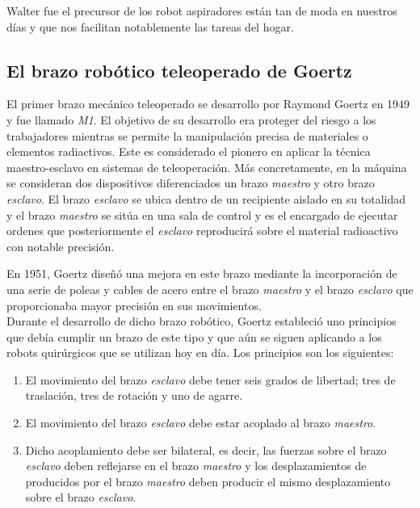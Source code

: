 Walter fue el precursor de los robot aspiradores están tan de moda en nuestros días y que nos facilitan notablemente las tareas del hogar.


\subsection{El brazo robótico teleoperado de Goertz}


El primer brazo mecánico teleoperado se desarrollo por Raymond Goertz en 1949 y fue llamado \textit{M1}. El objetivo de su desarrollo era proteger del riesgo a los trabajadores mientras se permite la manipulación precisa de materiales o elementos radiactivos. Este es considerado el pionero en aplicar la técnica maestro-esclavo en sistemas de teleoperación. Más concretamente, en la máquina se consideran dos dispositivos diferenciados un brazo \textit{maestro} y otro brazo \textit{esclavo}. El brazo \textit{esclavo} se ubica dentro de un recipiente aislado en su totalidad y el brazo \textit{maestro} se sitúa en una sala de control y es el encargado de ejecutar ordenes que posteriormente el \textit{esclavo} reproducirá sobre el material radioactivo con notable precisión.

En 1951, Goertz diseñó una mejora en este brazo mediante la incorporación de una serie de poleas y cables de acero entre el brazo \textit{maestro} y el brazo \textit{esclavo} que proporcionaba mayor precisión en sus movimientos.\\

Durante el desarrollo de dicho brazo robótico, Goertz estableció uno principios que debía cumplir un brazo de este tipo y que aún se siguen aplicando a los robots quirúrgicos que se utilizan hoy en día. Los principios son los siguientes:

\begin{enumerate}
\item El movimiento del brazo \textit{esclavo} debe tener seis grados de libertad; tres de traslación, tres de rotación y uno de agarre.

\item El movimiento del brazo \textit{esclavo} debe estar acoplado al brazo \textit{maestro}.

\item Dicho acoplamiento debe ser bilateral, es decir, las fuerzas sobre el brazo \textit{esclavo} deben reflejarse en el brazo \textit{maestro} y los desplazamientos de producidos por el brazo \textit{maestro} deben producir el mismo desplazamiento sobre el brazo \textit{esclavo}.

\end{enumerate}


